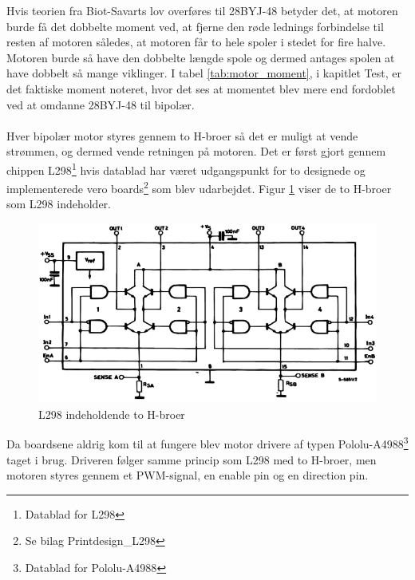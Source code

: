\noindent
Hvis teorien fra Biot-Savarts lov overføres til 28BYJ-48 betyder det, at motoren burde få det dobbelte moment ved, at fjerne den røde lednings forbindelse til resten af motoren således, at motoren får to hele spoler i stedet for fire halve. Motoren burde så have den dobbelte længde spole og dermed antages spolen at have dobbelt så mange viklinger. I tabel \ref{tab:motor_moment}, i kapitlet Test, er det faktiske moment noteret, hvor det ses at momentet blev mere end fordoblet ved at omdanne 28BYJ-48 til bipolær.
\\
\\
Hver bipolær motor styres gennem to H-broer så det er muligt at vende strømmen, og dermed vende retningen på motoren. Det er først gjort gennem chippen L298\footnote{Datablad for L298} hvis datablad har været udgangspunkt for to designede og implementerede vero boards\footnote{Se bilag Printdesign_L298} som blev udarbejdet. Figur \ref{fig:L298} viser de to H-broer som L298 indeholder.

\begin{figure}[H]
	\centerline{\includegraphics[scale=0.33]{tex/Design/L298}}
	\caption{L298 indeholdende to H-broer}
	\label{fig:L298}
\end{figure}

\noindent
Da boardsene aldrig kom til at fungere blev motor drivere af typen Pololu-A4988\footnote{Datablad for Pololu-A4988} taget i brug. Driveren følger samme princip som L298 med to H-broer, men motoren styres gennem et PWM-signal, en enable pin og en direction pin.